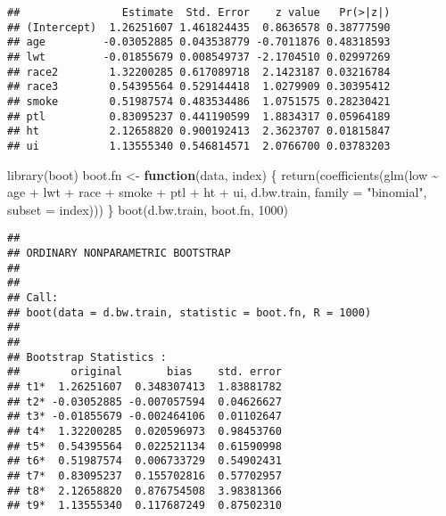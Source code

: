\documentclass[
]{article}
\newenvironment{Shaded}{\begin{snugshade}}{\end{snugshade}}
\newcommand{\AttributeTok}[1]{\textcolor[rgb]{0.77,0.63,0.00}{#1}}
\newcommand{\ControlFlowTok}[1]{\textcolor[rgb]{0.13,0.29,0.53}{\textbf{#1}}}
\newcommand{\DecValTok}[1]{\textcolor[rgb]{0.00,0.00,0.81}{#1}}
\newcommand{\FunctionTok}[1]{\textcolor[rgb]{0.00,0.00,0.00}{#1}}
\newcommand{\NormalTok}[1]{#1}
\newcommand{\OtherTok}[1]{\textcolor[rgb]{0.56,0.35,0.01}{#1}}
\newcommand{\SpecialCharTok}[1]{\textcolor[rgb]{0.00,0.00,0.00}{#1}}
\newcommand{\StringTok}[1]{\textcolor[rgb]{0.31,0.60,0.02}{#1}}
\begin{document}
\begin{Shaded}
\end{Shaded}

\begin{verbatim}
##                Estimate  Std. Error    z value   Pr(>|z|)
## (Intercept)  1.26251607 1.461824435  0.8636578 0.38777590
## age         -0.03052885 0.043538779 -0.7011876 0.48318593
## lwt         -0.01855679 0.008549737 -2.1704510 0.02997269
## race2        1.32200285 0.617089718  2.1423187 0.03216784
## race3        0.54395564 0.529144418  1.0279909 0.30395412
## smoke        0.51987574 0.483534486  1.0751575 0.28230421
## ptl          0.83095237 0.441190599  1.8834317 0.05964189
## ht           2.12658820 0.900192413  2.3623707 0.01815847
## ui           1.13555340 0.546814571  2.0766700 0.03783203
\end{verbatim}

\begin{Shaded}
\begin{Highlighting}[]
\FunctionTok{library}\NormalTok{(boot)}
\NormalTok{boot.fn }\OtherTok{\textless{}{-}} \ControlFlowTok{function}\NormalTok{(data, index) \{}
    \FunctionTok{return}\NormalTok{(}\FunctionTok{coefficients}\NormalTok{(}\FunctionTok{glm}\NormalTok{(low }\SpecialCharTok{\textasciitilde{}}\NormalTok{ age }\SpecialCharTok{+}\NormalTok{ lwt }\SpecialCharTok{+}\NormalTok{ race }\SpecialCharTok{+}\NormalTok{ smoke }\SpecialCharTok{+}\NormalTok{ ptl }\SpecialCharTok{+}\NormalTok{ ht }\SpecialCharTok{+}
\NormalTok{        ui, d.bw.train, }\AttributeTok{family =} \StringTok{"binomial"}\NormalTok{, }\AttributeTok{subset =}\NormalTok{ index)))}
\NormalTok{\}}
\FunctionTok{boot}\NormalTok{(d.bw.train, boot.fn, }\DecValTok{1000}\NormalTok{)}
\end{Highlighting}
\end{Shaded}

\begin{verbatim}
## 
## ORDINARY NONPARAMETRIC BOOTSTRAP
## 
## 
## Call:
## boot(data = d.bw.train, statistic = boot.fn, R = 1000)
## 
## 
## Bootstrap Statistics :
##        original       bias    std. error
## t1*  1.26251607  0.348307413  1.83881782
## t2* -0.03052885 -0.007057594  0.04626627
## t3* -0.01855679 -0.002464106  0.01102647
## t4*  1.32200285  0.020596973  0.98453760
## t5*  0.54395564  0.022521134  0.61590998
## t6*  0.51987574  0.006733729  0.54902431
## t7*  0.83095237  0.155702816  0.57702957
## t8*  2.12658820  0.876754508  3.98381366
## t9*  1.13555340  0.117687249  0.87502310
\end{verbatim}
\end{document}
